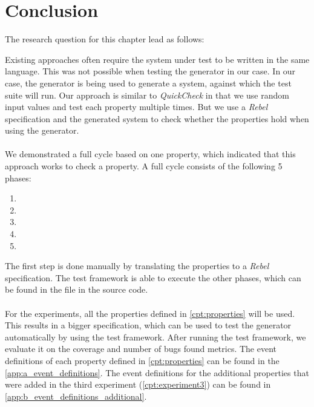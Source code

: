 

\section{Conclusion}
The research question for this chapter lead as follows:
\begin{quote}
  \rqTwo{}
\end{quote}
Existing approaches often require the system under test to be written in the
same language. This was not possible when testing the generator in our case. In
our case, the generator is being used to generate a system, against which the
test suite will run. Our approach is similar to \textit{QuickCheck} in that we use
random input values and test each property multiple times. But we use a
\textit{Rebel} specification and the generated system to check whether the
properties hold when using the generator.\\
\\
We demonstrated a full cycle based on one property, which indicated that this
approach works to check a property. A full cycle consists of the following 5
phases:
\begin{enumerate}
\item \tfPhaseOne{}
\item \tfPhaseTwo{}
\item \tfPhaseThree{}
\item \tfPhaseFour{}
\item \tfPhaseFive{}
\end{enumerate}
The first step is done manually by translating the properties to a
\textit{Rebel} specification. The test framework is able to execute the other
phases, which can be found in the  file in the source code.\\
\\
For the experiments, all the properties defined in \autoref{cpt:properties}
will be used. This results in a bigger specification, which can be used to test
the generator automatically by using the test framework. After running the test
framework, we evaluate it on the coverage and number of bugs found metrics. The
event definitions of each property defined in \autoref{cpt:properties} can be
found in the \autoref{app:a_event_definitions}. The event definitions for the
additional properties that were added in the third experiment
(\autoref{cpt:experiment3}) can be found in
\autoref{app:b_event_definitions_additional}.

